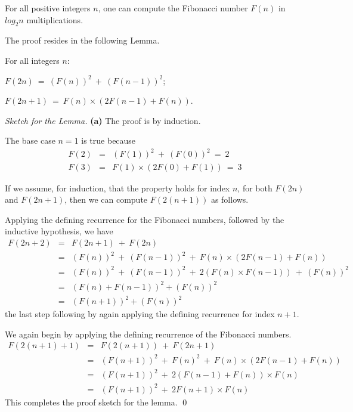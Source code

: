 \begin{prop}
For all positive integers $n$, one can compute the Fibonacci number $F(n)$ in $log_2 n$ multiplications.
\end{prop}

The proof resides in the following Lemma.

\begin{lemma}
For all integers $n$:

$F(2n) \ = \ (F(n))^2 \ + \ (F(n-1))^2$;

\smallskip

$F(2n+1) \ = \  F(n) \times (2 F(n-1) + F(n))$.
\end{lemma}

\smallskip

\begin{proof}[Sketch for the Lemma]
{\bf (a)} The proof is by induction.

\noindent
The base case $n=1$ is true because
\begin{eqnarray*}
F(2) & = & (F(1))^2 \ + \ (F(0))^2 \ = \ 2 \\
F(3) & = & F(1) \times (2F(0)+F(1)) \ = \ 3
\end{eqnarray*}

\medskip

If we assume, for induction, that the property holds for index $n$, for both $F(2n)$ and $F(2n+1)$, then we can compute $F(2(n+1))$ as follows.

\smallskip

Applying the defining recurrence for the Fibonacci numbers, followed by the inductive hypothesis, we have
\begin{eqnarray*}
F(2n+2) & = & F(2n+1) \ + \ F(2n) \\ 
              & = & (F(n))^2 \ + \ (F(n-1))^2 \ + \  F(n) \times (2 F(n-1) + F(n)) \\
              & = & (F(n))^2 \ + \ (F(n-1))^2 \ + \ 2 (F(n) \times F(n-1)) \ + \ (F(n))^2 \\
              & = & (F(n) + F(n-1))^2 + (F(n))^2 \\
              & = & (F(n+1))^2 + (F(n))^2
\end{eqnarray*}
the last step following by again applying the defining recurrence for index $n+1$.

\medskip 

We again begin by applying the defining recurrence of the Fibonacci numbers.
\begin{eqnarray*}
F(2(n+1)+1)  & = & F(2(n+1)) \ + \ F(2n+1) \\
                     & = & (F(n+1))^2 \ + \ F(n)^2 \ + \ F(n) \times (2 F(n-1) + F(n)) \\
                     & = & (F(n+1))^2 \ + \ 2 (F(n-1) + F(n)) \times F(n) \\
                     & = & (F(n+1))^2 \ + \ 2 F(n+1) \times F(n)
\end{eqnarray*}
This completes the proof sketch for the lemma.  \qed
\end{proof}
\smallskip

